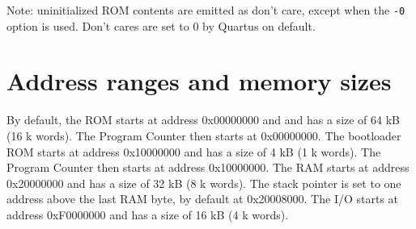 \documentclass[12pt]{article}
\begin{document}
Note: uninitialized ROM contents are emitted as don't care, except when the \lstinline|-0| option is used. Don't cares are set to 0 by Quartus on default.

%
%

\section{Address ranges and memory sizes}
By default, the ROM starts at address 0x00000000 and and has a size of 64 kB (16 k words). The Program Counter then starts at 0x00000000. The bootloader ROM starts at address 0x10000000 and has a size of 4 kB (1 k words). The Program Counter then starts at address 0x10000000. The RAM starts at address 0x20000000 and has a size of 32 kB (8 k words). The stack pointer is set to one address above the last RAM byte, by default at 0x20008000. The I/O starts at address 0xF0000000 and has a size of 16 kB (4 k words).
\end{document}
